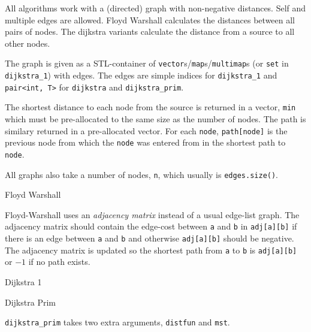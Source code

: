 
All algorithms work with a (directed) graph with non-negative distances.
Self and multiple edges are allowed. Floyd Warshall calculates the distances
between all pairs of nodes. The dijkstra variants calculate the
distance from a source to all other nodes.

The graph is given as a STL-container of
{\tt vector}s/{\tt map}s/{\tt multimap}s
(or {\tt set} in {\tt dijkstra\_1}) with edges.
The edges are simple indices for {\tt dijkstra\_1} and {\tt pair<int, T>} for
{\tt dijkstra} and {\tt dijkstra\_prim}.

The shortest distance to each node from the source is returned in a vector,
{\tt min} which must be pre-allocated to the same size as the number of nodes.
The path is similary returned in a pre-allocated vector. For each {\tt node},
{\tt path[node]} is the previous node from which the {\tt node} was entered
from in the shortest path to {\tt node}.

All graphs also take a number of nodes, {\tt n}, which usually is
{\tt edges.size()}.

\begin{algorithm}{Floyd Warshall}

Floyd-Warshall uses an \emph{adjacency matrix} instead of a usual edge-list
graph. The adjacency matrix should contain the edge-cost between
{\tt a} and {\tt b} in {\tt adj[a][b]} if there is an edge between
{\tt a} and {\tt b} and otherwise {\tt adj[a][b]} should be negative.
The adjacency matrix is updated so the shortest path from {\tt a} to
{\tt b} is {\tt adj[a][b]} or $-1$ if no path exists.
\end{algorithm}

\begin{algorithm}{Dijkstra 1}
\end{algorithm}

\begin{algorithm}{Dijkstra Prim}

{\tt dijkstra\_prim} takes two extra arguments, {\tt distfun} and {\tt mst}.
\end{algorithm}


